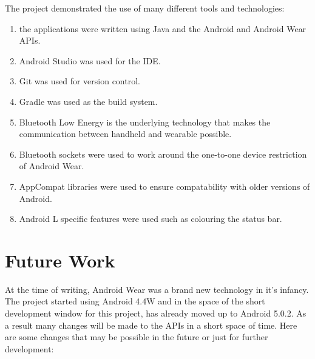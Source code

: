 The project demonstrated the use of many different tools and technologies:
\begin{enumerate}
\item the applications were written using Java and the Android and Android
    Wear APIs.
\item Android Studio was used for the IDE.
\item Git was used for version control.
\item Gradle was used as the build system.
\item Bluetooth Low Energy is the underlying technology that makes the
    communication between handheld and wearable possible.
\item Bluetooth sockets were used to work around the one-to-one device
    restriction of Android Wear.
\item AppCompat libraries were used to ensure compatability with older versions
    of Android.
\item Android L specific features were used such as colouring the status bar.
\end{enumerate}

\section{Future Work}

At the time of writing, Android Wear was a brand new technology in it's infancy.
The project started using Android 4.4W and in the space of the short development
window for this project, has already moved up to Android 5.0.2. As a result many
changes will be made to the APIs in a short space of time. Here are some changes
that may be possible in the future or just for further development:

